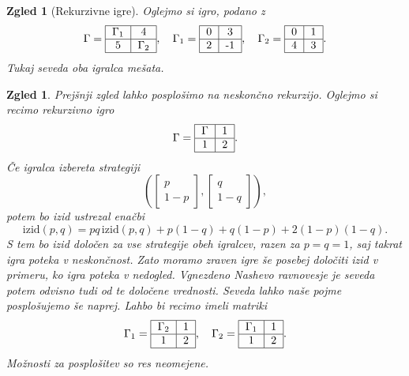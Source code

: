 \documentclass[10pt, a4paper]{article}
\newtheorem{zgled}[izr]{Zgled}
\begin{document}
\begin{zgled}[Rekurzivne igre]
  Oglejmo si igro, podano z 
  $$
    \Gamma = {\begin{tabular}{|c|c|}
        \hline
        $\Gamma_1$ & 4\\
        \hline
        5 & $\Gamma_2$\\
        \hline
    \end{tabular}}, \quad         
    \Gamma_1 = {\begin{tabular}{|c|c|}
      \hline
      0 & 3\\
      \hline
      2 & -1\\
      \hline
  \end{tabular}},\quad 
  \Gamma_2 = {\begin{tabular}{|c|c|}
    \hline
    0 & 1\\
    \hline
    4 & 3\\
    \hline
\end{tabular}}.
$$
Tukaj seveda oba igralca mešata.
\end{zgled}

\begin{zgled}
  Prejšnji zgled lahko posplošimo na neskončno rekurzijo.
  Oglejmo si recimo rekurzivno igro 
  $$\Gamma = {\begin{tabular}{|c|c|}
    \hline
    $\Gamma$ & 1\\
    \hline
    1 & 2\\
    \hline
\end{tabular}}.$$
Če igralca izbereta strategiji 
$$\left(\begin{bmatrix}
  p \\ 1 - p
\end{bmatrix}, \begin{bmatrix}
  q\\ 1 - q
\end{bmatrix}\right),$$
potem bo izid ustrezal enačbi 
$$\mathrm{izid} (p, q) = pq\, \mathrm{izid} (p, q) + p(1 - q) + q (1 - p) + 2(1 - p)(1 - q).$$
S tem bo izid določen za vse strategije obeh igralcev, razen za
$p = q = 1$, saj takrat igra poteka v neskončnost. Zato moramo zraven igre še posebej določiti izid v 
primeru, ko igra poteka v nedogled. Vgnezdeno Nashevo ravnovesje je seveda potem odvisno tudi od te določene vrednosti.
Seveda lahko naše pojme posplošujemo še naprej. Lahbo bi recimo imeli matriki 
$$\Gamma_1 = {\begin{tabular}{|c|c|}
  \hline
  $\Gamma_2$ & 1\\
  \hline
  1 & 2\\
  \hline
\end{tabular}},\quad \Gamma_2 = 
{\begin{tabular}{|c|c|}
  \hline
  $\Gamma_1$ & 1\\
  \hline
  1 & 2\\
  \hline
\end{tabular}}.$$
Možnosti za posplošitev so res neomejene.
\end{zgled}
\end{document}
